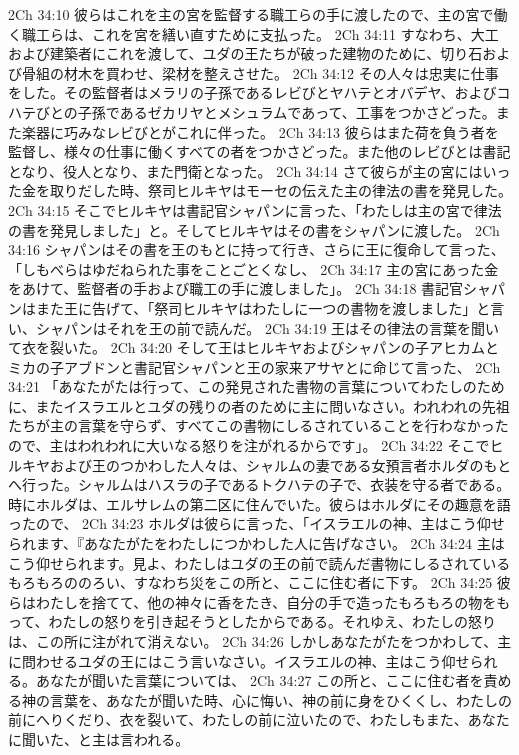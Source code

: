 2Ch 34:10  彼らはこれを主の宮を監督する職工らの手に渡したので、主の宮で働く職工らは、これを宮を繕い直すために支払った。
2Ch 34:11  すなわち、大工および建築者にこれを渡して、ユダの王たちが破った建物のために、切り石および骨組の材木を買わせ、梁材を整えさせた。
2Ch 34:12  その人々は忠実に仕事をした。その監督者はメラリの子孫であるレビびとヤハテとオバデヤ、およびコハテびとの子孫であるゼカリヤとメシュラムであって、工事をつかさどった。また楽器に巧みなレビびとがこれに伴った。
2Ch 34:13  彼らはまた荷を負う者を監督し、様々の仕事に働くすべての者をつかさどった。また他のレビびとは書記となり、役人となり、また門衛となった。
2Ch 34:14  さて彼らが主の宮にはいった金を取りだした時、祭司ヒルキヤはモーセの伝えた主の律法の書を発見した。
2Ch 34:15  そこでヒルキヤは書記官シャパンに言った、「わたしは主の宮で律法の書を発見しました」と。そしてヒルキヤはその書をシャパンに渡した。
2Ch 34:16  シャパンはその書を王のもとに持って行き、さらに王に復命して言った、「しもべらはゆだねられた事をことごとくなし、
2Ch 34:17  主の宮にあった金をあけて、監督者の手および職工の手に渡しました」。
2Ch 34:18  書記官シャパンはまた王に告げて、「祭司ヒルキヤはわたしに一つの書物を渡しました」と言い、シャパンはそれを王の前で読んだ。
2Ch 34:19  王はその律法の言葉を聞いて衣を裂いた。
2Ch 34:20  そして王はヒルキヤおよびシャパンの子アヒカムとミカの子アブドンと書記官シャパンと王の家来アサヤとに命じて言った、
2Ch 34:21  「あなたがたは行って、この発見された書物の言葉についてわたしのために、またイスラエルとユダの残りの者のために主に問いなさい。われわれの先祖たちが主の言葉を守らず、すべてこの書物にしるされていることを行わなかったので、主はわれわれに大いなる怒りを注がれるからです」。
2Ch 34:22  そこでヒルキヤおよび王のつかわした人々は、シャルムの妻である女預言者ホルダのもとへ行った。シャルムはハスラの子であるトクハテの子で、衣装を守る者である。時にホルダは、エルサレムの第二区に住んでいた。彼らはホルダにその趣意を語ったので、
2Ch 34:23  ホルダは彼らに言った、「イスラエルの神、主はこう仰せられます、『あなたがたをわたしにつかわした人に告げなさい。
2Ch 34:24  主はこう仰せられます。見よ、わたしはユダの王の前で読んだ書物にしるされているもろもろののろい、すなわち災をこの所と、ここに住む者に下す。
2Ch 34:25  彼らはわたしを捨てて、他の神々に香をたき、自分の手で造ったもろもろの物をもって、わたしの怒りを引き起そうとしたからである。それゆえ、わたしの怒りは、この所に注がれて消えない。
2Ch 34:26  しかしあなたがたをつかわして、主に問わせるユダの王にはこう言いなさい。イスラエルの神、主はこう仰せられる。あなたが聞いた言葉については、
2Ch 34:27  この所と、ここに住む者を責める神の言葉を、あなたが聞いた時、心に悔い、神の前に身をひくくし、わたしの前にへりくだり、衣を裂いて、わたしの前に泣いたので、わたしもまた、あなたに聞いた、と主は言われる。
